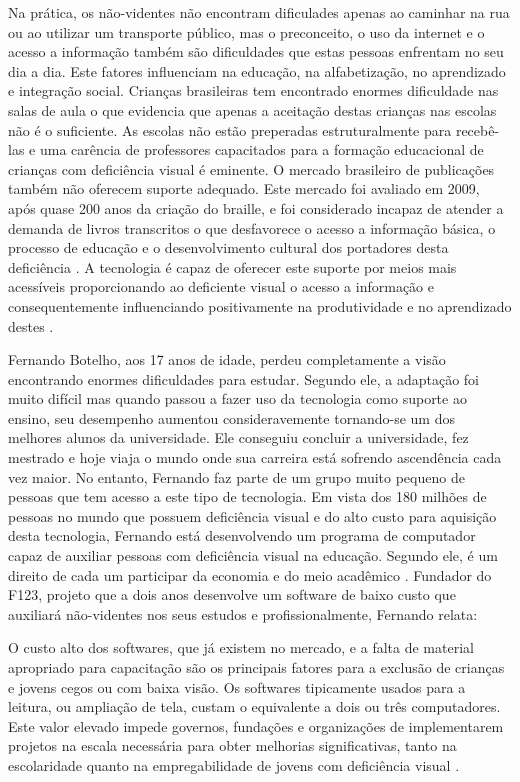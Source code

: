 Na prática, os não-videntes não encontram dificulades apenas ao caminhar na rua ou ao utilizar um transporte público, mas o preconceito, o uso da internet e o acesso a informação também são dificuldades que estas pessoas enfrentam no seu dia a dia. Este fatores influenciam na educação, na alfabetização, no aprendizado e integração social. Crianças brasileiras tem encontrado enormes dificuldade nas salas de aula o que evidencia que apenas a aceitação destas crianças nas escolas não é o suficiente. As escolas não estão preperadas estruturalmente para recebê-las e uma carência de professores capacitados para a formação educacional de crianças com deficiência visual é eminente. O mercado brasileiro de publicações também não oferecem suporte adequado. Este mercado foi avaliado em 2009, após quase 200 anos da criação do braille, e foi considerado incapaz de atender a demanda de livros transcritos o que desfavorece o acesso a informação básica, o processo de educação e o desenvolvimento cultural dos portadores desta deficiência \cite{escolasbrasileiras}. A tecnologia é capaz de oferecer este suporte por meios mais acessíveis proporcionando ao deficiente visual o acesso a informação e consequentemente influenciando positivamente na produtividade e no aprendizado destes \cite{revistaabc}.

Fernando Botelho, aos 17 anos de idade, perdeu completamente a visão encontrando enormes dificuldades para estudar. Segundo ele, a adaptação foi muito difícil mas quando passou a fazer uso da tecnologia como suporte ao ensino, seu desempenho aumentou consideravemente tornando-se um dos melhores alunos da universidade. Ele conseguiu concluir a universidade, fez mestrado e hoje viaja o mundo onde sua carreira está sofrendo ascendência cada vez maior. No entanto, Fernando faz parte de um grupo muito pequeno de pessoas que tem acesso a este tipo de tecnologia. Em vista dos 180 milhões de pessoas no mundo que possuem deficiência visual e do alto custo para aquisição desta tecnologia, Fernando está desenvolvendo um programa de computador capaz de auxiliar pessoas com deficiência visual na educação. Segundo ele, é um direito de cada um participar da economia e do meio acadêmico \cite{botelho}. Fundador do F123, projeto que a dois anos desenvolve um software de baixo custo que auxiliará não-videntes nos seus estudos e profissionalmente, Fernando relata:

\begin{citacao}
O custo alto dos softwares, que já existem no mercado, e a falta de material apropriado para capacitação são os principais fatores para a exclusão de crianças e jovens cegos ou com baixa visão. Os softwares tipicamente usados para a leitura, ou ampliação de tela, custam o equivalente a dois ou três computadores. Este valor elevado impede governos, fundações e organizações de implementarem projetos na escala necessária para obter melhorias significativas, tanto na escolaridade quanto na empregabilidade de jovens com deficiência visual \cite{botelho}.
\end{citacao}

